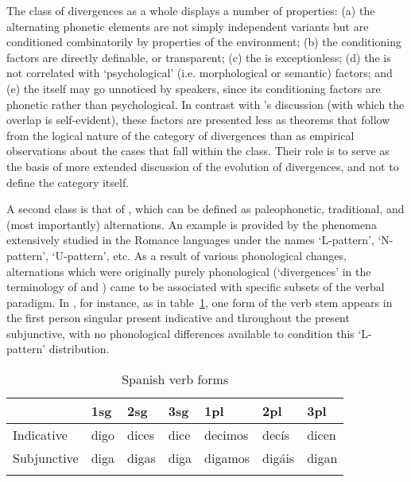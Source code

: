 The class of divergences as a whole displays a number of properties:
(a) the alternating phonetic elements are not simply independent
variants but are conditioned combinatorily by properties of the
environment; (b) the conditioning factors are directly definable, or
transparent; (c) the  is exceptionless; (d) the 
is not correlated with `psychological' (i.e. morphological or
semantic) factors; and (e) the  itself may go unnoticed by
speakers, since its conditioning factors are phonetic rather than
psychological. In contrast with {\Kruszewski}'s discussion (with which
the overlap is self-evident), these factors are presented less as
theorems that follow from the logical nature of the category of
divergences than as empirical observations about the cases that fall
within the class. Their role is to serve as the basis of more extended
discussion of the evolution of divergences, and not to define the
category itself.

A second class is that of , which can be defined as
paleophonetic, traditional, and (most importantly)  
alternations. An example is provided by the phenomena extensively
studied in the Romance languages \citet[and
elsewhere]{maiden05:morphological-autonomy} under the names
`L-pattern', `N-pattern', `U-pat\-tern', etc. As a result of various
phonological changes, alternations which were originally purely
phonological (`divergences' in the terminology of {\Kruszewski} and {\Baudouin}) came
to be associated with specific subsets of the verbal paradigm. In
, for instance, as in table~\ref{tab:spanish-l-pattern}, one
form of the verb stem appears in the first person singular present
indicative and throughout the present subjunctive, with no
phonological differences available to condition this `L-pattern'
distribution.

\begin{table}[ht]
  \begin{tabularx}{\textwidth}{Xlll@{\qquad}lll}
  \lsptoprule
    & 1sg & 2sg & 3sg & 1pl & 2pl & 3pl\\
    \midrule
    Indicative & digo & dices & dice & decimos & decís & dicen\\
    Subjunctive & diga & digas & diga & digamos & digáis & digan\\
    \lspbottomrule
  \end{tabularx}
  \caption{Spanish verb forms}
  \label{tab:spanish-l-pattern}
\end{table}

